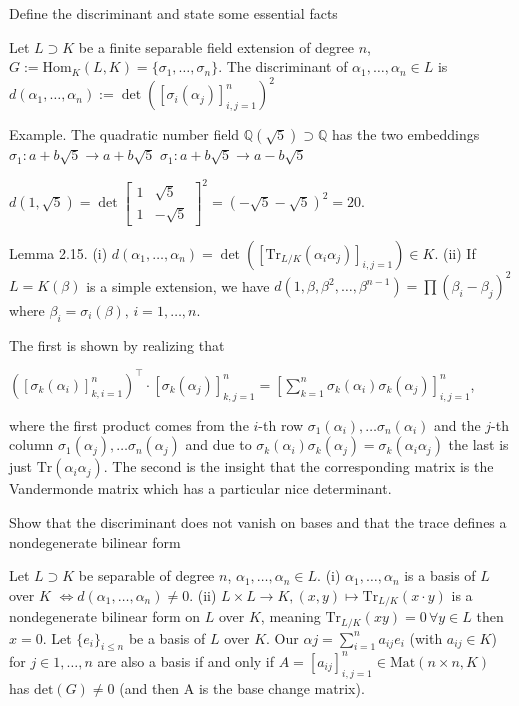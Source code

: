 Define the discriminant and state some essential facts

Let \(L \supset K\) be a finite separable field extension of degree \(n\), \(G := \text{Hom}_K(L, K) = \{\sigma_1, \ldots, \sigma_n\}\). 
The discriminant of \(\alpha_1, \ldots, \alpha_n \in L\) is
\(
d(\alpha_1, \ldots, \alpha_n) := \det \left( \left[ \sigma_i(\alpha_j) \right]_{i,j=1}^n \right)^2
\)

Example. 
The quadratic number field \(\mathbb{Q}(\sqrt{5}) \supset \mathbb{Q}\) has the two embeddings
\(
\sigma_1 : a + b\sqrt{5} \to a + b\sqrt{5}
\)
\(
\sigma_1 : a + b\sqrt{5} \to a - b\sqrt{5}
\)

\(
d(1, \sqrt{5}) = \det \begin{bmatrix} 1 & \sqrt{5} \\ 1 & -\sqrt{5} \end{bmatrix}^2 = (-\sqrt{5} - \sqrt{5})^2 = 20.
\)

Lemma 2.15.
(i) \(d(\alpha_1, \ldots, \alpha_n) = \det \left( [\text{Tr}_{L/K}(\alpha_i\alpha_j)]_{i,j=1} \right) \in K.\)
(ii) If \(L = K(\beta)\) is a simple extension, we have
\(
d(1, \beta, \beta^2, \ldots, \beta^{n-1}) = \prod (\beta_i - \beta_j)^2
\)
where \(\beta_i = \sigma_i(\beta), \, i = 1, \ldots, n.\)

The first is shown by realizing that

\(\left([\sigma_k(\alpha_i)]_{k,i=1}^n\right)^\top \cdot [\sigma_k(\alpha_j)]_{k,j=1}^n= \left[ \sum_{k=1}^n \sigma_k(\alpha_i)\sigma_k(\alpha_j)\right]_{i,j=1}^n\),

where the first product comes from the \( i \)-th row \( \sigma_1(\alpha_i), \dots \sigma_n(\alpha_i)\)
and the \( j \)-th column \( \sigma_1(\alpha_j), \dots \sigma_n(\alpha_j)\) and due to \( \sigma_k(\alpha_i)\sigma_k(\alpha_j) = \sigma_k(\alpha_i \alpha_j)\) the last is just \( \text{Tr}(\alpha_i\alpha_j) \). The second is the insight that the corresponding matrix
is the Vandermonde matrix which has a particular nice determinant.

Show that the discriminant does not vanish on bases and that the trace defines
a nondegenerate bilinear form 

Let \(L \supset K\) be separable of degree \(n\), \(\alpha_1, \ldots, \alpha_n \in L\).
(i) \(\alpha_1, \ldots, \alpha_n\) is a basis of \(L\) over \(K\) \(\iff d(\alpha_1, \ldots, \alpha_n) \neq 0\).
(ii) \(L \times L \to K, (x, y) \mapsto \text{Tr}_{L/K}(x \cdot y)\)
is a nondegenerate bilinear form on \( L \) over \( K \),
meaning \(\text{Tr}_{L/K}(xy) = 0 \, \forall y \in L\) then \( x = 0 \).
Let \( \{e_i\}_{i \leq n}\) be a basis of \( L \) over \(K\).
Our \( αj = \sum^n_{i=1} a_{ij}e_i \) (with \( a_{ij} \in K \)) for \( j \in 1, \dots, n \) are also a basis if and only if
\(A = [a_{ij}]^n_{i,j=1} ∈ \text{Mat}(n×n, K)\) has \( \text{det}(G) \neq 0 \) (and then A is the base change matrix).

